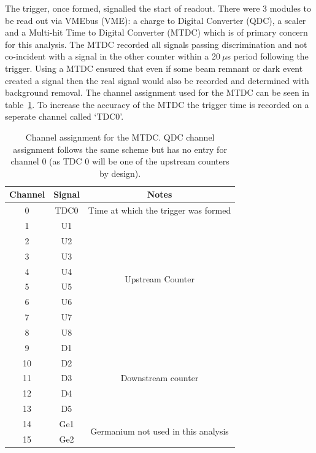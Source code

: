 \documentclass[]{article}
\newcommand{\ms}{$~\mu$s}
\begin{document}
The trigger, once formed, signalled the start of readout. There were 3 modules to be read out via VMEbus (VME): a charge to Digital Converter (QDC), a scaler and a Multi-hit Time to Digital Converter (MTDC) which is of primary concern for this analysis. The MTDC recorded all signals passing discrimination and not co-incident with a signal in the other counter within a 20\ms{} period following the trigger. Using a MTDC ensured that even if some beam remnant or dark event created a signal then the real signal would also be recorded and determined with background removal. The channel assignment used for the MTDC can be seen in table~\ref{tab:mtdc_ch}. To increase the accuracy of the MTDC the trigger time is recorded on a seperate channel called `TDC0'.
\begin{table}
    \begin{center}
    \begin{tabular}{c|c|c}
        Channel & Signal & Notes\\
        \hline
        0  & TDC0 & Time at which the trigger was formed \\
        \hline
        1  & U1   & \multirow{8}{*}{Upstream Counter}\\
        2  & U2   & \\
        3  & U3   & \\
        4  & U4   & \\
        5  & U5   & \\
        6  & U6   & \\
        7  & U7   & \\
        8  & U8   & \\
        \hline
        9  & D1   & \multirow{5}{*}{Downstream counter}\\
        10 & D2   & \\
        11 & D3   & \\
        12 & D4   & \\
        13 & D5   & \\
        \hline
        14 & Ge1  & \multirow{2}{*}{Germanium not used in this analysis}\\
        15 & Ge2  & \\
    \end{tabular}
    \end{center}
    \caption{Channel assignment for the MTDC. QDC channel assignment follows the same scheme but has no entry for channel 0 (as TDC 0 will be one of the upstream counters by design).}
    \label{tab:mtdc_ch}
\end{table}
\end{document}
